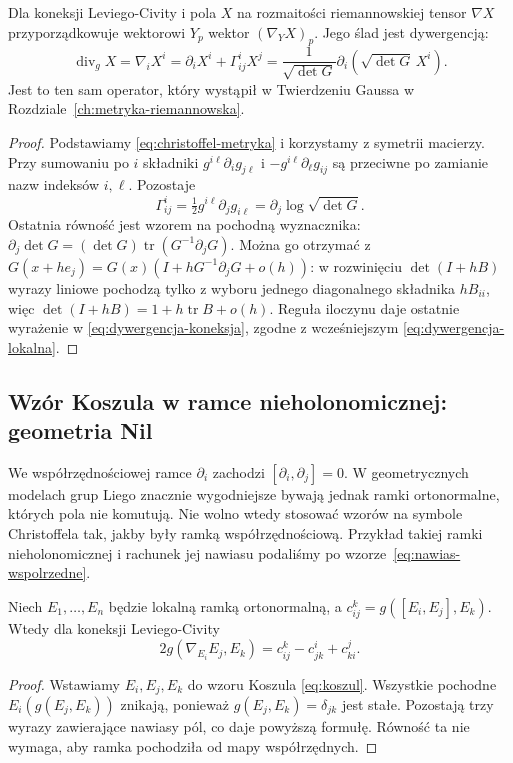 \begin{stwierdzenie}
\label{prop:dywergencja-koneksja}
Dla koneksji Leviego-Civity i pola $X$ na rozmaitości
riemannowskiej tensor $\nabla X$ przyporządkowuje wektorowi
$Y_p$ wektor $(\nabla_YX)_p$. Jego ślad jest dywergencją:
\begin{equation}\label{eq:dywergencja-koneksja}
 \operatorname{div}_gX=\nabla_iX^i
 =\partial_iX^i+\Gamma^i_{ij}X^j
 =\frac1{\sqrt{\det G}}\partial_i
       (\sqrt{\det G}\,X^i).
\end{equation}
Jest to ten sam operator, który wystąpił
w Twierdzeniu Gaussa w Rozdziale~\ref{ch:metryka-riemannowska}.
\end{stwierdzenie}
\begin{proof}
Podstawiamy \eqref{eq:christoffel-metryka}
i korzystamy z symetrii macierzy. Przy sumowaniu
po $i$ składniki
$g^{i\ell}\partial_i g_{j\ell}$
i $-g^{i\ell}\partial_\ell g_{ij}$ są przeciwne
po zamianie nazw indeksów $i,\ell$.
Pozostaje
\[
 \Gamma^i_{ij}=\tfrac12g^{i\ell}\partial_jg_{i\ell}
 =\partial_j\log\sqrt{\det G}.
\]
Ostatnia równość jest wzorem na pochodną
wyznacznika: $\partial_j\det G
=(\det G)\operatorname{tr}(G^{-1}\partial_jG)$.
Można go otrzymać z
$G(x+he_j)=G(x)(I+hG^{-1}\partial_jG+o(h))$:
w rozwinięciu $\det(I+hB)$ wyrazy liniowe pochodzą
tylko z wyboru jednego diagonalnego składnika $hB_{ii}$,
więc $\det(I+hB)=1+h\operatorname{tr}B+o(h)$.
Reguła iloczynu daje ostatnie wyrażenie
w \eqref{eq:dywergencja-koneksja}, zgodne
z wcześniejszym \eqref{eq:dywergencja-lokalna}.
\end{proof}

\subsection*{Wzór Koszula w ramce nieholonomicznej: geometria Nil}
\label{sec:thur-dop-koszul-rama}
We współrzędnościowej ramce $\partial_i$ zachodzi $[\partial_i,\partial_j]=0$.
W geometrycznych modelach grup Liego znacznie wygodniejsze bywają jednak
ramki ortonormalne, których pola nie komutują. Nie wolno wtedy stosować
wzorów na symbole Christoffela tak, jakby były ramką współrzędnościową.
Przykład takiej ramki nieholonomicznej i rachunek jej nawiasu
podaliśmy po wzorze~\eqref{eq:nawias-wspolrzedne}.

\begin{stwierdzenie}
\label{prop:thur-dop-koszul-rama}
Niech $E_1,\ldots,E_n$ będzie lokalną ramką ortonormalną,
a $c_{ij}^{k}=g([E_i,E_j],E_k)$. Wtedy dla koneksji Leviego-Civity
\begin{equation}\label{eq:thur-dop-koszul-rama}
2g(\nabla_{E_i}E_j,E_k)
=c_{ij}^{k}-c_{jk}^{i}+c_{ki}^{j}.
\end{equation}
\end{stwierdzenie}
\begin{proof}
Wstawiamy $E_i,E_j,E_k$ do wzoru Koszula
\eqref{eq:koszul}. Wszystkie pochodne $E_i(g(E_j,E_k))$
znikają, ponieważ $g(E_j,E_k)=\delta_{jk}$ jest stałe.
Pozostają trzy wyrazy zawierające nawiasy pól,
co daje powyższą formułę. Równość ta nie wymaga,
aby ramka pochodziła od mapy współrzędnych.
\end{proof}

